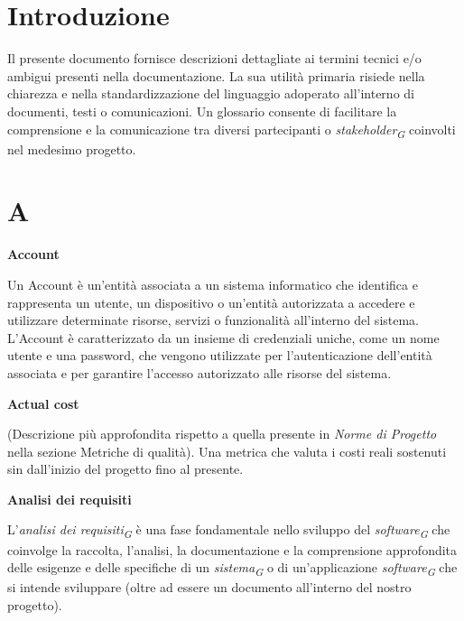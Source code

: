 \documentclass{article}
\begin{document}
\section*{Introduzione}
Il presente documento fornisce descrizioni dettagliate ai termini tecnici e/o ambigui presenti nella documentazione.
La sua utilità primaria risiede nella chiarezza e nella standardizzazione del linguaggio adoperato all'interno di documenti, testi o comunicazioni. Un glossario consente di facilitare la comprensione e la comunicazione tra diversi partecipanti o \textit{stakeholder}\textsubscript{\textit{G}} coinvolti nel medesimo progetto.

\section*{A}
{}

\vspace{0.4cm}

\textbf{Account}

\vspace{0.1cm}

Un Account è un'entità associata a un sistema informatico che identifica e rappresenta un utente, un dispositivo o un'entità autorizzata a accedere e utilizzare determinate risorse, servizi o funzionalità all'interno del sistema. L'Account è caratterizzato da un insieme di credenziali uniche, come un nome utente e una password, che vengono utilizzate per l'autenticazione dell'entità associata e per garantire l'accesso autorizzato alle risorse del sistema.

\vspace{0.4cm}

\textbf{Actual cost}

\vspace{0.1cm}

(Descrizione più approfondita rispetto a quella presente in \textit{Norme di Progetto} nella sezione Metriche di qualità). Una metrica che valuta i costi reali sostenuti sin dall'inizio del progetto fino al presente.

\vspace{0.4cm}

\textbf{Analisi dei requisiti}

\vspace{0.1cm}

L'\textit{analisi dei requisiti}\textsubscript{\textit{G}} è una fase fondamentale nello sviluppo del \textit{software}\textsubscript{\textit{G}} che coinvolge la raccolta, l'analisi, la documentazione e la comprensione approfondita delle esigenze e delle specifiche di un \textit{sistema}\textsubscript{\textit{G}} o di un'applicazione \textit{software}\textsubscript{\textit{G}} che si intende sviluppare (oltre ad essere un documento all’interno del nostro progetto).
\end{document}
